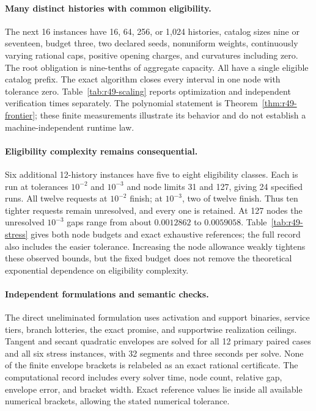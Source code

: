 \paragraph{Many distinct histories with common eligibility.}
The next 16 instances have 16, 64, 256, or 1,024 histories, catalog sizes nine or seventeen, budget three, two declared seeds, nonuniform weights, continuously varying rational caps, positive opening charges, and curvatures including zero. The root obligation is nine-tenths of aggregate capacity. All have a single eligible catalog prefix. The exact algorithm closes every interval in one node with tolerance zero. Table~\ref{tab:r49-scaling} reports optimization and independent verification times separately. The polynomial statement is Theorem~\ref{thm:r49-frontier}; these finite measurements illustrate its behavior and do not establish a machine-independent runtime law.

\paragraph{Eligibility complexity remains consequential.}
Six additional 12-history instances have five to eight eligibility classes. Each is run at tolerances $10^{-2}$ and $10^{-3}$ and node limits 31 and 127, giving 24 specified runs. All twelve requests at $10^{-2}$ finish; at $10^{-3}$, two of twelve finish. Thus ten tighter requests remain unresolved, and every one is retained. At 127 nodes the unresolved $10^{-3}$ gaps range from about $0.0012862$ to $0.0059058$. Table~\ref{tab:r49-stress} gives both node budgets and exact exhaustive references; the full record also includes the easier tolerance. Increasing the node allowance weakly tightens these observed bounds, but the fixed budget does not remove the theoretical exponential dependence on eligibility complexity.

\paragraph{Independent formulations and semantic checks.}
The direct uneliminated formulation uses activation and support binaries, service tiers, branch lotteries, the exact promise, and supportwise realization ceilings. Tangent and secant quadratic envelopes are solved for all 12 primary paired cases and all six stress instances, with 32 segments and three seconds per solve.  None of the finite envelope brackets is relabeled as an exact rational certificate. The computational record includes every solver time, node count, relative gap, envelope error, and bracket width. Exact reference values lie inside all available numerical brackets, allowing the stated numerical tolerance.


